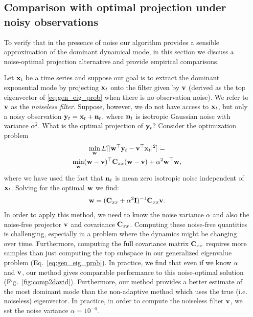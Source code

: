 \documentclass[%
 reprint,
 amsmath,amssymb,
 aps,
]{revtex4-2}
\begin{document}
\subsection{Comparison with optimal projection under noisy observations}

To verify that in the presence of noise our algorithm provides a sensible approximation of the dominant dynamical mode, in this section we discuss a noise-optimal projection alternative and provide empirical comparisons.

Let ${\bf x}_t$ be a time series and suppose our goal is to extract the dominant exponential mode by projecting ${\bf x}_t$ onto the filter given by ${\bf v}$ (derived as the top eigenvector of \eqref{eq:gen_eig_prob} when there is no observation noise). We refer to ${\bf v}$ as the \emph{noiseless filter}. Suppose, however, we do not have access to ${\bf x}_t$, but only a noisy observation ${\bf y}_t={\bf x}_t+{\bf n}_t$, where ${\bf n}_t$ is isotropic Gaussian noise with variance $\alpha^2$. What is the optimal projection of ${\bf y}_t$? Consider the optimization problem
\begin{multline*}
    \min_{{\bf w}} E[|{\bf w}^\top{\bf y}_t-{\bf v}^\top{\bf x}_t|^2]=\\
    \min_{\bf w} ({\bf w}-{\bf v})^\top{\bf C}_{xx}({\bf w}-{\bf v})+\alpha^2{\bf w}^\top{\bf w},
\end{multline*}
where we have used the fact that ${\bf n}_t$ is mean zero isotropic noise independent of ${\bf x}_t$. Solving for the optimal ${\bf w}$ we find:
\begin{align}
    {\bf w}=({\bf C}_{xx}+\alpha^2{\bf I})^{-1}{\bf C}_{xx}{\bf v}.
    \label{eq:noise_optimal}
\end{align}
In order to apply this method, we need to know the noise variance $\alpha$ and also the noise-free projector ${\bf v}$ and covariance ${\bf C}_{xx}$. Computing these noise-free quantities is challenging, especially in a problem where the dynamics might be changing over time. Furthermore, computing the full covariance matrix ${\bf C}_{xx}$ requires more samples than just computing the top subspace in our generalized eigenvalue problem (Eq.~\eqref{eq:gen_eig_prob}). In practice, we find that even if we know $\alpha$ and ${\bf v}$, our method gives comparable performance to this noise-optimal solution (Fig.~\ref{fig:comp2david}). Furthermore, our method provides a better estimate of the most dominant mode than the non-adaptive method which uses the true (i.e. noiseless) eigenvector. In practice, in order to compute the noiseless filter ${\bf v}$, we set the noise variance $\alpha=10^{-6}$.
\end{document}
